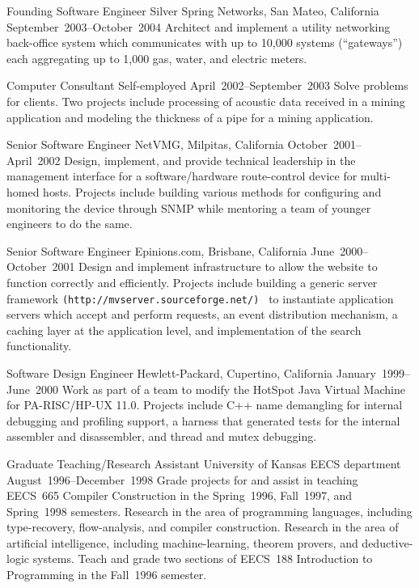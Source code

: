 \documentclass{resume}
\begin{document}
\begin{resume}
\begin{Employment}
\begin{job}{Founding Software Engineer}
           {Silver Spring Networks, San Mateo, California}
           {September~2003--October~2004}
Architect and implement a utility networking back-office system which communicates with up to 10,000 systems (``gateways'') each aggregating up to 1,000 gas, water, and electric meters.
\end{job}
\begin{job}{Computer Consultant}
           {Self-employed}
           {April~2002--September~2003}
Solve problems for clients. Two projects include processing of acoustic data received in a mining application and modeling the thickness of a pipe for a mining application.
\end{job}
\begin{job}{Senior Software Engineer}
           {NetVMG, Milpitas, California}
           {October~2001--April~2002}
Design, implement, and provide technical leadership in the 
management interface for a software/hardware route-control 
device for multi-homed hosts. Projects include building various 
methods for configuring and monitoring the device through SNMP 
while mentoring a team of younger engineers to do the same.
\end{job}

\begin{job}{Senior Software Engineer}
           {Epinions.com, Brisbane, California}
           {June~2000--October~2001}
Design and implement infrastructure to allow the website to function
correctly and efficiently. Projects include building a generic server
framework {\tt (http://mvserver.sourceforge.net/) } to instantiate
application servers which accept and perform requests, an event
distribution mechanism, a caching layer at the application level, and
implementation of the search functionality.
\end{job}

\begin{job}{Software Design Engineer}
           {Hewlett-Packard, Cupertino, California}
           {January~1999--June~2000}
Work as part of a team to modify the HotSpot Java Virtual Machine 
for PA-RISC/HP-UX 11.0. Projects include C++ name demangling 
for internal debugging and profiling support, a harness that 
generated tests for the internal assembler and disassembler, 
and thread and mutex debugging.
\end{job}

\begin{job}{Graduate Teaching/Research Assistant}
           {University of Kansas EECS department}
           {August~1996--December~1998}
  Grade projects for and assist in teaching EECS~665 Compiler Construction
  in the Spring~1996, Fall~1997, and Spring~1998 semesters.
  Research in the area of programming languages, including
  type-recovery, flow-analysis, and compiler construction.
  Research in the area of artificial intelligence, including
  machine-learning, theorem provers, and deductive-logic systems.
  Teach and grade two sections of EECS~188 Introduction to
  Programming in the Fall~1996 semester.
\end{job}


\end{Employment}
\end{resume}
\end{document}
